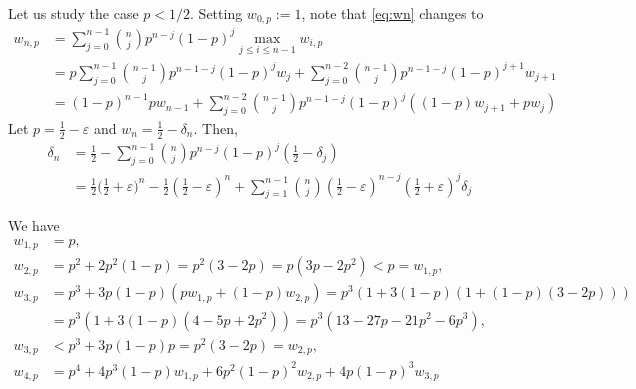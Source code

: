 \documentclass{article}
\theoremstyle{definition}
\theoremstyle{step} \newtheorem{step}{Step}
\begin{document}
\newpage


Let us study the case $p<1/2$. Setting $w_{0,p} := 1$, note that
\eqref{eq:wn} changes to
\begin{align}\label{eq:wn1}
  w_{n,p} & = \sum_{j=0}^{n-1} \binom n j p^{n-j} (1-p)^j \max_{j\leq
    i\leq n-1} w_{i,p} \\ & = p \sum_{j=0}^{n-1} \binom{n-1}{j}
  p^{n-1-j}(1-p)^j w_j + \sum_{j=0}^{n-2} \binom{n-1}{j}
  p^{n-1-j}(1-p)^{j+1} w_{j+1} \\ & = (1-p)^{n-1}p w_{n-1} +
  \sum_{j=0}^{n-2} \binom{n-1}{j} p^{n-1-j}(1-p)^j ((1-p)w_{j+1} +
  pw_j)
\end{align}
Let $p = \tfrac 12 - \varepsilon$ and $w_n = \tfrac 12 -
\delta_n$. Then,
\begin{align}\label{eq:wn1}
  \delta_{n} & = \tfrac 12 - \sum_{j=0}^{n-1} \binom n j p^{n-j}
  (1-p)^j (\tfrac 12 -\delta_j) \\ & = \tfrac 12 \big( \tfrac 12 +
  \varepsilon\big)^n - \tfrac 12 (\tfrac 12 -\varepsilon)^n +
  \sum_{j=1}^{n-1} \binom{n}{j} (\tfrac 12 - \varepsilon)^{n-j}
  (\tfrac 12 + \varepsilon)^j \delta_j 
\end{align}


We have
\begin{align*}
  w_{1,p} & = p,\\ w_{2,p} & = p^2 + 2p^2(1-p) = p^2(3-2p) = p
  (3p-2p^2) < p = w_{1,p},\\ w_{3,p} & = p^3 + 3p(1-p)(p w_{1,p} +
  (1-p) w_{2,p}) = p^3(1 + 3(1-p)(1 + (1-p)(3-2p))) \\ & = p^3(1 +
  3(1-p)(4 -5p + 2p^2)) = p^3(13 -27p -21p^2 - 6p^3),\\ w_{3,p} & <
  p^3 + 3p(1-p)p = p^2(3-2p) = w_{2,p}, \\ w_{4,p} & = p^4 +
  4p^3(1-p)w_{1,p} + 6p^2(1-p)^2w_{2,p} + 4p(1-p)^3 w_{3,p}
\end{align*}
\end{document}

